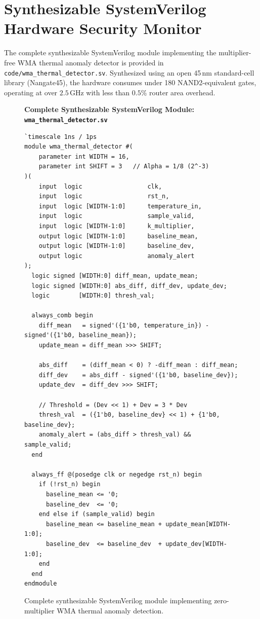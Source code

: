 \section{Synthesizable SystemVerilog Hardware Security Monitor}
\label{sec:security-rtl}

The complete synthesizable SystemVerilog module implementing the multiplier-free WMA thermal anomaly detector is provided in \texttt{code/wma\_thermal\_detector.sv}. Synthesized using an open 45\,nm standard-cell library (Nangate45), the hardware consumes under 180 NAND2-equivalent gates, operating at over $2.5\,\mathrm{GHz}$ with less than $0.5\%$ router area overhead.

\begin{figure}[p]
\centering
\begin{svgraybox}
\textbf{Complete Synthesizable SystemVerilog Module: \texttt{wma\_thermal\_detector.sv}} \\
\small
\begin{verbatim}
`timescale 1ns / 1ps
module wma_thermal_detector #(
    parameter int WIDTH = 16,
    parameter int SHIFT = 3   // Alpha = 1/8 (2^-3)
)(
    input  logic                  clk,
    input  logic                  rst_n,
    input  logic [WIDTH-1:0]      temperature_in,
    input  logic                  sample_valid,
    input  logic [WIDTH-1:0]      k_multiplier,
    output logic [WIDTH-1:0]      baseline_mean,
    output logic [WIDTH-1:0]      baseline_dev,
    output logic                  anomaly_alert
);
  logic signed [WIDTH:0] diff_mean, update_mean;
  logic signed [WIDTH:0] abs_diff, diff_dev, update_dev;
  logic        [WIDTH:0] thresh_val;

  always_comb begin
    diff_mean   = signed'({1'b0, temperature_in}) - signed'({1'b0, baseline_mean});
    update_mean = diff_mean >>> SHIFT;

    abs_diff    = (diff_mean < 0) ? -diff_mean : diff_mean;
    diff_dev    = abs_diff - signed'({1'b0, baseline_dev});
    update_dev  = diff_dev >>> SHIFT;

    // Threshold = (Dev << 1) + Dev = 3 * Dev
    thresh_val  = ({1'b0, baseline_dev} << 1) + {1'b0, baseline_dev};
    anomaly_alert = (abs_diff > thresh_val) && sample_valid;
  end

  always_ff @(posedge clk or negedge rst_n) begin
    if (!rst_n) begin
      baseline_mean <= '0;
      baseline_dev  <= '0;
    end else if (sample_valid) begin
      baseline_mean <= baseline_mean + update_mean[WIDTH-1:0];
      baseline_dev  <= baseline_dev  + update_dev[WIDTH-1:0];
    end
  end
endmodule
\end{verbatim}
\end{svgraybox}
\caption{Complete synthesizable SystemVerilog module implementing zero-multiplier WMA thermal anomaly detection.}
\label{fig:wma-full-verilog}
\end{figure}

